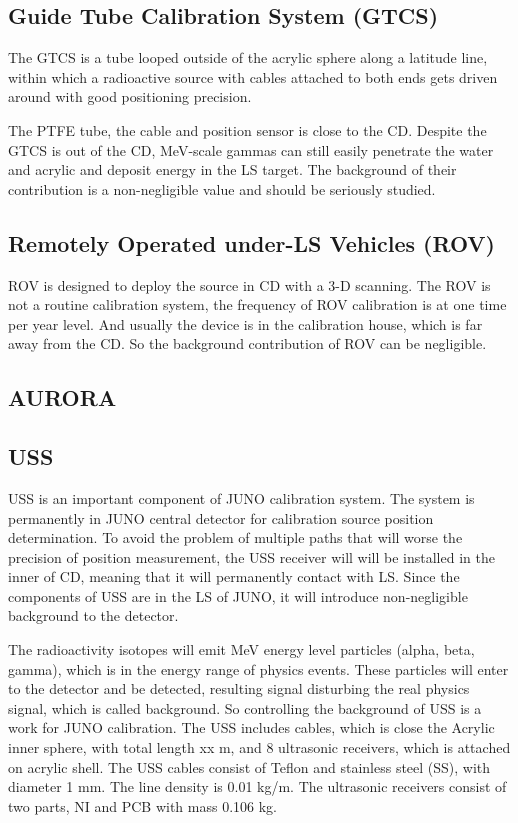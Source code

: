\documentclass[review,number,sort&compress]{elsarticle}
\begin{document}
\subsection{Guide Tube Calibration System (GTCS)}
The GTCS is a tube looped outside of the acrylic sphere along a
latitude line, within which a radioactive source with cables attached
to both ends gets driven around with good positioning precision.  

The PTFE tube, the cable and position sensor is close to the CD.
Despite the GTCS is out of the CD, MeV-scale gammas can still easily penetrate 
the water and acrylic and deposit energy in the LS target.
The background of their contribution is a non-negligible value and 
should be seriously studied.

\subsection{Remotely Operated under-LS Vehicles (ROV)}

ROV is designed to deploy the source in CD with a 3-D scanning.
The ROV is not a routine calibration system, the frequency of ROV calibration
is at one time per year level.
And usually the device is in the calibration house, which is far away from the CD.
So the background contribution of ROV can be negligible.

\subsection{AURORA}

\subsection{USS}

USS is an important component of JUNO calibration system. 
The system is permanently in JUNO central detector for calibration source position determination. 
To avoid the problem of multiple paths that will worse the precision of position measurement, 
the USS receiver will will be installed in the inner of CD, meaning that it will permanently contact with LS.
Since the components of USS are in the LS of JUNO, it will introduce non-negligible background to the detector. 

The radioactivity isotopes will emit MeV energy level particles (alpha, beta, gamma), which is in the energy range of physics events.
These particles will enter to the detector and be detected, resulting signal disturbing the real physics signal, which is called background. So controlling the background of USS is a work for JUNO calibration.
The USS includes cables, which is close the Acrylic inner sphere, with total length xx m, and 8 ultrasonic receivers, which is attached on acrylic shell. The USS cables consist of Teflon and stainless steel (SS), with diameter 1 mm. The line density is 0.01 kg/m. The ultrasonic receivers consist of two parts, NI and PCB with mass 0.106 kg. 
\end{document}
